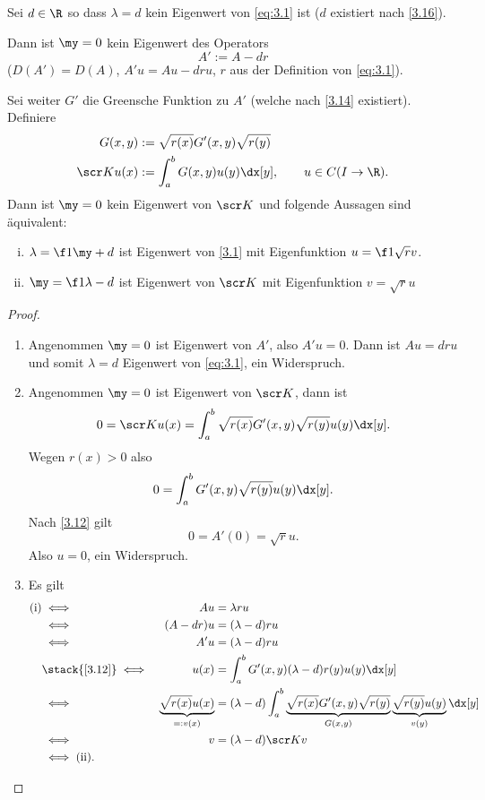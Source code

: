 \begin{st} \label{3.17}
	Sei $d\in \R$ so dass $\lambda = d$ kein Eigenwert von \eqref{eq:3.1} ist ($d$ existiert nach \ref{3.16}).

	Dann ist $\my = 0$ kein Eigenwert des Operators
	\[
		A' := A - dr
	\]
	($D(A') = D(A)$, $A'u = Au - dru$, $r$ aus der Definition von \eqref{eq:3.1}).

	Sei weiter $G'$ die Greensche Funktion zu $A'$ (welche nach \ref{3.14} existiert).
	Definiere
	\begin{align*}
		G(x,y) &:= \sqrt {r(x)} G'(x,y) \sqrt{r(y)} \\
		\scr K u(x) &:= \int_a^b G(x,y) u(y) \dx[y],  \qquad \text{$u\in C(I\to \R)$}.
	\end{align*}
	Dann ist $\my = 0$ kein Eigenwert von $\scr K$ und folgende Aussagen sind äquivalent:
	\begin{enumerate}[(i)]
		\item
			$\lambda = \f 1\my + d$ ist Eigenwert von \eqref{3.1} mit Eigenfunktion $u=\f 1{\sqrt r} v$.
		\item
			$\my = \f 1{\lambda -d}$ ist Eigenwert von $\scr K$ mit Eigenfunktion $v = \sqrt{r} u$
	\end{enumerate}
	\begin{proof}
		\begin{enumerate}[1)]
			\item
				Angenommen $\my = 0$ ist Eigenwert von $A'$, also $A'u = 0$.
				Dann ist $Au = dru$ und somit $\lambda = d$ Eigenwert von \eqref{eq:3.1}, ein Widerspruch.
			\item
				Angenommen $\my = 0$ ist Eigenwert von $\scr K$, dann ist
				\begin{align*}
					0 = \scr K u(x) = \int_a^b \sqrt{r(x)} G'(x,y) \sqrt{r(y)} u(y) \dx[y].
				\end{align*}
				Wegen $r(x) > 0$ also
				\begin{align*}
					0 = \int_a^b G'(x,y) \sqrt{r(y)} u(y) \dx[y].
				\end{align*}
				Nach \ref{3.12} gilt 
				\[
					0 = A'(0) = \sqrt{r} u. 
				\]
				Also $u = 0$, ein Widerspruch.
			\item
				Es gilt
				\begin{alignat*}{2}
					\text{(i)} &\iff& Au &= \lambda ru \\
					&\iff& (A-dr)u &= (\lambda - d)ru \\
					&\iff& A' u &= (\lambda -d)ru \\ 
					&\stack{\ref{3.12}}\iff& u(x) &= \int_a^b G'(x,y) (\lambda -d) r(y) u(y) \dx[y] \\
					&\iff& \underbrace{\sqrt{r(x)} u(x)}_{=:v(x)} &= (\lambda - d) \int_a^b \underbrace{\sqrt{r(x)} G'(x,y) \sqrt{r(y)}}_{G(x,y)} \underbrace{\sqrt{r(y)} u(y)}_{v(y)} \dx[y] \\
					&\iff& v &= (\lambda -d) \scr K v \\
					&\iff \text{(ii).}&&
				\end{alignat*}
		\end{enumerate}
	\end{proof}
\end{st}

